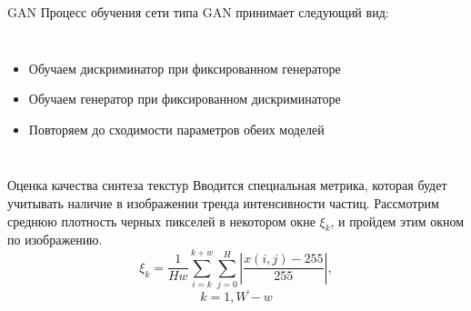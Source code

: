 \documentclass[12pt]{beamer}
\begin{document}
	\begin{frame}{GAN}
		Процесс обучения сети типа GAN принимает следующий вид:
		\begin{columns}
			\begin{itemize}
				\item Обучаем дискриминатор при фиксированном генераторе
				\item Обучаем генератор при фиксированном дискриминаторе
				\item Повторяем до сходимости параметров обеих моделей
			\end{itemize}
			\begin{figure}
			\end{figure}
		\end{columns}
	\end{frame}
	
	\begin{frame}{Оценка качества синтеза текстур}
		Вводится специальная метрика, которая будет учитывать наличие в изображении тренда интенсивности частиц. Рассмотрим среднюю плотность черных пикселей в некотором окне $\xi_k$, и пройдем этим окном по изображению.
		$$\xi_k = \frac{1}{H w}{\sum_{i=k}^{k+w} \sum_{j=0}^{H}\left| \frac{x(i, j) - 255}{255} \right|}, $$$$k = \overline{1, W - w} $$
	\end{frame}
	
\end{document}
